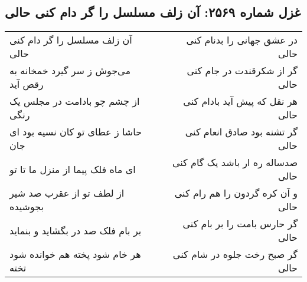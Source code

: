 \begin{center}
\section*{غزل شماره ۲۵۶۹: آن زلف مسلسل را گر دام کنی حالی}
\label{sec:2569}
\begin{longtable}{l p{0.5cm} r}
آن زلف مسلسل را گر دام کنی حالی
&&
در عشق جهانی را بدنام کنی حالی
\\
می‌جوش ز سر گیرد خمخانه به رقص آید
&&
گر از شکرقندت در جام کنی حالی
\\
از چشم چو بادامت در مجلس یک رنگی
&&
هر نقل که پیش آید بادام کنی حالی
\\
حاشا ز عطای تو کان نسیه بود ای جان
&&
گر تشنه بود صادق انعام کنی حالی
\\
ای ماه فلک پیما از منزل ما تا تو
&&
صدساله ره ار باشد یک گام کنی حالی
\\
از لطف تو از عقرب صد شیر بجوشیده
&&
و آن کره گردون را هم رام کنی حالی
\\
بر بام فلک صد در بگشاید و بنماید
&&
گر حارس بامت را بر بام کنی حالی
\\
هر خام شود پخته هم خوانده شود تخته
&&
گر صبح رخت جلوه در شام کنی حالی
\\
\end{longtable}
\end{center}
